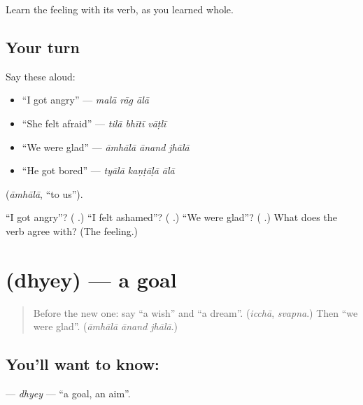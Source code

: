 Learn the feeling with its verb, as you learned \textbf{  } whole.

\subsection*{Your turn}
Say these aloud:

\begin{itemize}
\raggedright
  \item \textquotedblleft{}I got angry\textquotedblright{} — \emph{malā rāg ālā}
  \item \textquotedblleft{}She felt afraid\textquotedblright{} — \emph{tilā bhītī vāṭlī}
  \item \textquotedblleft{}We were glad\textquotedblright{} — \emph{āmhālā ānand jhālā}
  \item \textquotedblleft{}He got bored\textquotedblright{} — \emph{tyālā kaṇṭāḷā ālā}
\end{itemize}

\textbf{} (\emph{āmhālā}, \textquotedblleft{}to us\textquotedblright{}).

\begin{tcolorbox}[breakable,colback=teal!4,colframe=teal!35!black,title={Before you move on}]
\textquotedblleft{}I got angry\textquotedblright{}? (\textbf{  }.) \textquotedblleft{}I felt ashamed\textquotedblright{}? (\textbf{  }.) \textquotedblleft{}We were glad\textquotedblright{}? (\textbf{  }.) What does the verb agree with? (The feeling.)
\end{tcolorbox}
\section[\texorpdfstring{\mr{ध्येय} (dhyey)}{ध्येय (dhyey)}]{ (dhyey) — a goal}

\label{lesson:MR-C284-dhyey}



\begin{quote}
Before the new one: say \textquotedblleft{}a wish\textquotedblright{} and \textquotedblleft{}a dream\textquotedblright{}. (\emph{icchā}, \emph{svapna}.) Then \textquotedblleft{}we were glad\textquotedblright{}. (\emph{āmhālā ānand jhālā}.)
\end{quote}

\subsection*{You'll want to know: }
\textbf{} — \emph{dhyey} — \textquotedblleft{}a goal, an aim\textquotedblright{}.

